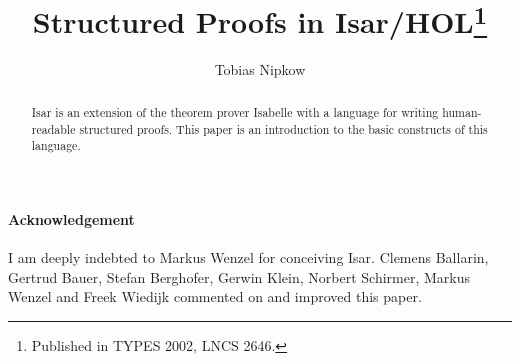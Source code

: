 \documentclass[envcountsame]{llncs}
\newcommand{\tweakskip}{\vspace{-\medskipamount}}
\newcommand{\Tweakskip}{\tweakskip\tweakskip}
\begin{document}
\title{%
Structured Proofs in Isar/HOL\thanks{Published in TYPES 2002, LNCS 2646.}}
\author{Tobias Nipkow}
\date{}
\maketitle

\begin{abstract}
  Isar is an extension of the theorem prover Isabelle with a language
  for writing human-readable structured proofs. This paper is an
  introduction to the basic constructs of this language.
\end{abstract}



\Tweakskip\Tweakskip


\small
\paragraph{Acknowledgement}
I am deeply indebted to Markus Wenzel for conceiving Isar. Clemens Ballarin,
Gertrud Bauer, Stefan Berghofer, Gerwin Klein, Norbert Schirmer,
Markus Wenzel and Freek Wiedijk commented on and improved this paper.

\begingroup
 \small\raggedright\frenchspacing

\endgroup
\end{document}
